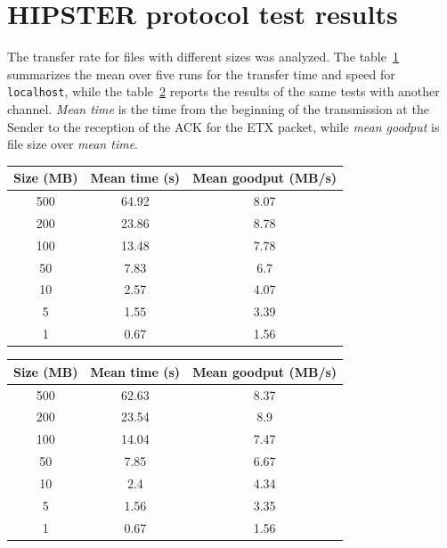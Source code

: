 \documentclass[10pt,twocolumn]{article}
\begin{document}
\section{HIPSTER protocol test results}
The transfer rate for files with different sizes was analyzed. The
table~\ref{table:ourChannel} summarizes the mean over five runs for the transfer time and speed for
\texttt{localhost}, while the table~\ref{table:anotherChannel} reports the results of the same tests with another channel. \textit{Mean time} is the time from the beginning of the transmission at the Sender to the reception of the ACK for the ETX packet, while \textit{mean goodput} is file size over \textit{mean time}.
\begin{table}[h]
\centering
\begin{tabular}{|c|c|c|}
	Size (MB) & Mean time (s) & Mean goodput (MB/s)\\ \hline
  500       & 64.92    & 8.07  \\
  200       & 23.86    & 8.78  \\
	100       & 13.48    & 7.78  \\
	50        & 7.83     & 6.7 \\
	10        & 2.57     & 4.07 \\
	5         & 1.55     & 3.39  \\
	1         & 0.67     & 1.56  \\
\end{tabular}
\label{table:ourChannel}
\end{table}

\begin{table}[h]
\centering
\begin{tabular}{|c|c|c|}
  Size (MB) & Mean time (s) & Mean goodput (MB/s)\\ \hline
  500       & 62.63    & 8.37  \\
  200       & 23.54    & 8.9  \\
  100       & 14.04    & 7.47  \\
  50        & 7.85     & 6.67 \\
  10        & 2.4      & 4.34 \\
  5         & 1.56     & 3.35 \\
  1         & 0.67     & 1.56 \\

\end{tabular}
\label{table:anotherChannel}
\end{table}
\end{document}
